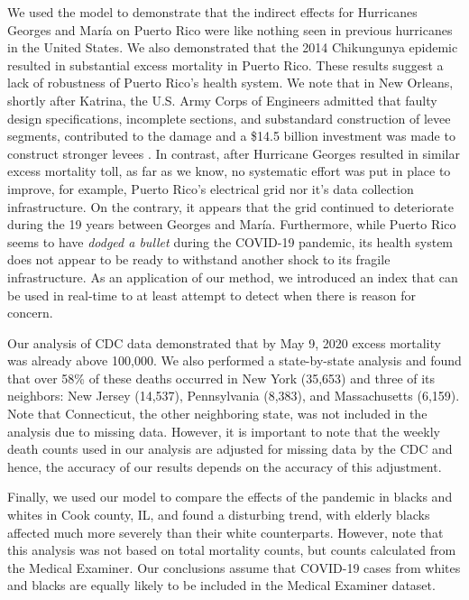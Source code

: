 \documentclass[11pt]{article}
\begin{document}
We used the model to demonstrate that the indirect effects for Hurricanes Georges and Mar\'ia on Puerto Rico were like nothing seen in previous hurricanes in the United States. We also demonstrated that the 2014 Chikungunya epidemic resulted in substantial excess mortality in Puerto Rico. These results suggest a lack of robustness of Puerto Rico's health system. We note that in New Orleans, shortly after Katrina, the U.S. Army Corps of Engineers admitted that faulty design specifications, incomplete sections, and substandard construction of levee segments, contributed to the damage and a \$14.5 billion investment was made to construct stronger levees \cite{kates2006reconstruction, interagency2007performance, adelson2018}. In contrast, after Hurricane Georges resulted in similar excess mortality toll, as far as we know, no systematic effort was put in place to improve, for example, Puerto Rico’s electrical grid nor it's data collection infrastructure. On the contrary, it appears that the grid continued to deteriorate during the 19 years between Georges and Mar\'ia. Furthermore, while Puerto Rico seems to have \emph{dodged a bullet} during the COVID-19 pandemic, its health system does not appear to be ready to withstand another shock to its fragile infrastructure. As an application of our method, we introduced an index that can be used in real-time to at least attempt to detect when there is reason for concern. 

Our analysis of CDC data demonstrated that by May 9, 2020 excess mortality was already above 100,000. We also performed a state-by-state analysis and found that over 58\% of these deaths occurred in New York (35,653) and three of its neighbors: New Jersey (14,537), Pennsylvania (8,383), and Massachusetts (6,159). Note that Connecticut, the other neighboring state, was not included in the analysis due to missing data. However, it is important to note that the weekly death counts used in our analysis are adjusted for missing data by the CDC \cite{cdc2020covid19} and hence, the accuracy of our results depends on the accuracy of this adjustment. 

Finally, we used our model to compare the effects of the pandemic in blacks and whites in Cook county, IL,  and found a disturbing trend, with elderly blacks affected much more severely than their white counterparts. However, note that this analysis was not based on total mortality counts, but counts calculated from the Medical Examiner. Our conclusions assume that COVID-19 cases from whites and blacks are equally likely to be included in the Medical Examiner dataset. 
\end{document}
